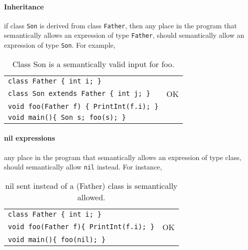 \documentclass{article}
\begin{document}
\paragraph{Inheritance} if class \verb"Son" is derived from class \verb"Father",
then any place in the program that semantically allows an expression of type \verb"Father",
should semantically allow an expression of type \verb"Son".
For example,
\begin{table}[h]
\centering
\begin{tabular}{ | l  | l | }
\hline
\verb"class Father { int i; }"               &    \\
\verb"class Son extends Father { int j; }"   & OK \\
\verb"void foo(Father f) { PrintInt(f.i); }" &    \\
\verb"void main(){ Son s; foo(s); }"         &    \\
\hline
\end{tabular}
\caption{Class Son is a semantically valid input for foo.
\label{Table_Code_Examples_Son_Class_Instead_Of_Father_Class}}
\end{table}
\paragraph{nil expressions} any place in the program that
semantically allows an expression of type class,
should semantically allow \verb"nil" instead.
For instance,
\begin{table}[h]
\centering
\begin{tabular}{ | l | l | }
\hline
\verb"class Father { int i; }"              &    \\
\verb"void foo(Father f){ PrintInt(f.i); }" & OK \\
\verb"void main(){ foo(nil); }"            &    \\
\hline
\end{tabular}
\caption{nil sent instead of a (Father) class is semantically allowed.
\label{Table_Code_Examples_nil_Instead_Of_Any_Class}}
\end{table}
\end{document}
